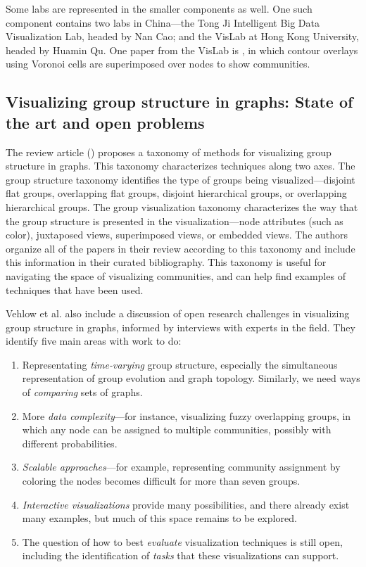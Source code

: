 Some labs are represented in the smaller components as well. One such
component contains two labs in China---the Tong Ji Intelligent Big Data
Visualization Lab, headed by Nan Cao; and the VisLab at Hong Kong
University, headed by Huamin Qu. One paper from the VisLab is
\autocite{wu_interactive_2015}, in which contour overlays using Voronoi
cells are superimposed over nodes to show communities.

\subsection{Visualizing group structure in graphs: State of the art and
open
problems}\label{visualizing-group-structure-in-graphs-state-of-the-art-and-open-problems}

The review article (\autocite{vehlow_state_2015}) proposes a taxonomy of
methods for visualizing group structure in graphs. This taxonomy
characterizes techniques along two axes. The group structure taxonomy
identifies the type of groups being visualized---disjoint flat groups,
overlapping flat groups, disjoint hierarchical groups, or overlapping
hierarchical groups. The group visualization taxonomy characterizes the
way that the group structure is presented in the visualization---node
attributes (such as color), juxtaposed views, superimposed views, or
embedded views. The authors organize all of the papers in their review
according to this taxonomy and include this information in their curated
bibliography. This taxonomy is useful for navigating the space of
visualizing communities, and can help find examples of techniques that
have been used.

Vehlow et al. also include a discussion of open research challenges in
visualizing group structure in graphs, informed by interviews with
experts in the field. They identify five main areas with work to do:

\begin{enumerate}
\def\labelenumi{\arabic{enumi}.}
\tightlist
\item
  Representating \emph{time-varying} group structure, especially the
  simultaneous representation of group evolution and graph topology.
  Similarly, we need ways of \emph{comparing} sets of graphs.
\item
  More \emph{data complexity}---for instance, visualizing fuzzy
  overlapping groups, in which any node can be assigned to multiple
  communities, possibly with different probabilities.
\item
  \emph{Scalable approaches}---for example, representing community
  assignment by coloring the nodes becomes difficult for more than seven
  groups.
\item
  \emph{Interactive visualizations} provide many possibilities, and
  there already exist many examples, but much of this space remains to
  be explored.
\item
  The question of how to best \emph{evaluate} visualization techniques
  is still open, including the identification of \emph{tasks} that these
  visualizations can support.
\end{enumerate}
